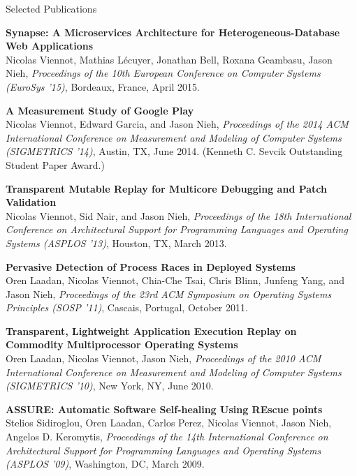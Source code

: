\documentclass{resume} %
\begin{document}
\begin{rSection}{Selected Publications}
\begin{list}{.}{\leftmargin=0em}
\newenvironment{pub}[5]{ {\bf #1} \\ #2, {\em #3 (#4)}, #5}

\item \pub{Synapse: A Microservices Architecture for Heterogeneous-Database Web Applications}
{Nicolas Viennot, Mathias L\'{e}cuyer, Jonathan Bell, Roxana Geambasu, Jason Nieh}
{Proceedings of the 10th European Conference on Computer Systems}
{EuroSys '15}{Bordeaux, France, April 2015.}

\item \pub{A Measurement Study of Google Play}
{Nicolas Viennot, Edward Garcia, and Jason Nieh}
{Proceedings of the 2014 ACM International Conference on Measurement and Modeling of Computer Systems}
{SIGMETRICS '14}{Austin, TX, June 2014. (Kenneth C. Sevcik Outstanding Student Paper Award.)}


\item \pub{Transparent Mutable Replay for Multicore Debugging and Patch Validation}
{Nicolas Viennot, Sid Nair, and Jason Nieh}
{Proceedings of the 18th International Conference on Architectural Support for Programming Languages and Operating Systems}
{ASPLOS '13}{Houston, TX, March 2013.}

\item \pub{Pervasive Detection of Process Races in Deployed Systems}
{Oren Laadan, Nicolas Viennot, Chia-Che Tsai, Chris Blinn, Junfeng Yang, and Jason Nieh}
{Proceedings of the 23rd ACM Symposium on Operating Systems Principles}
{SOSP '11}{Cascais, Portugal, October 2011.}

\item \pub{Transparent, Lightweight Application Execution Replay on Commodity Multiprocessor Operating Systems}
{Oren Laadan, Nicolas Viennot, Jason Nieh}
{Proceedings of the 2010 ACM International Conference on Measurement and Modeling of Computer Systems}
{SIGMETRICS '10}{New York, NY, June 2010.}

\item \pub{ASSURE: Automatic Software Self-healing Using REscue points}
{Stelios Sidiroglou, Oren Laadan, Carlos Perez, Nicolas Viennot, Jason Nieh, Angelos D. Keromytis}
{Proceedings of the 14th International Conference on Architectural Support for Programming Languages and Operating Systems}
{ASPLOS '09}{Washington, DC, March 2009.}

\end{list}
\end{rSection}
\end{document}
